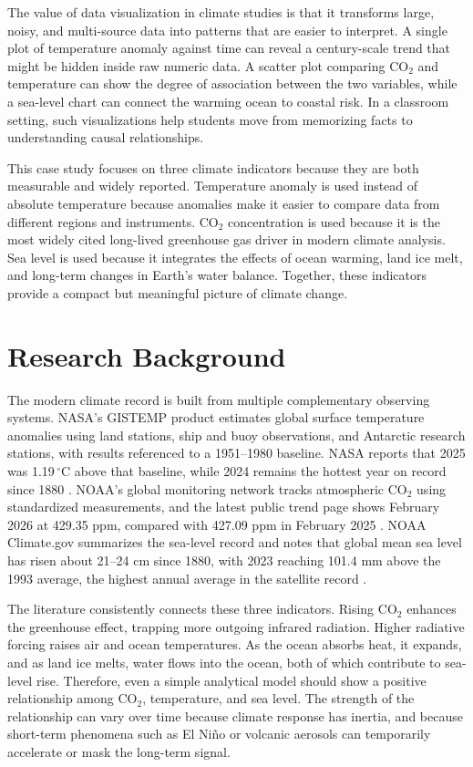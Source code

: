 \documentclass[conference]{IEEEtran}
\begin{document}
The value of data visualization in climate studies is that it transforms large, noisy, and multi-source data into patterns that are easier to interpret. A single plot of temperature anomaly against time can reveal a century-scale trend that might be hidden inside raw numeric data. A scatter plot comparing CO$_2$ and temperature can show the degree of association between the two variables, while a sea-level chart can connect the warming ocean to coastal risk. In a classroom setting, such visualizations help students move from memorizing facts to understanding causal relationships.

This case study focuses on three climate indicators because they are both measurable and widely reported. Temperature anomaly is used instead of absolute temperature because anomalies make it easier to compare data from different regions and instruments. CO$_2$ concentration is used because it is the most widely cited long-lived greenhouse gas driver in modern climate analysis. Sea level is used because it integrates the effects of ocean warming, land ice melt, and long-term changes in Earth’s water balance. Together, these indicators provide a compact but meaningful picture of climate change.

\section{Research Background}
The modern climate record is built from multiple complementary observing systems. NASA’s GISTEMP product estimates global surface temperature anomalies using land stations, ship and buoy observations, and Antarctic research stations, with results referenced to a 1951--1980 baseline. NASA reports that 2025 was 1.19\,$^\circ$C above that baseline, while 2024 remains the hottest year on record since 1880 \cite{nasa_temp,nasa_worldofchange}. NOAA’s global monitoring network tracks atmospheric CO$_2$ using standardized measurements, and the latest public trend page shows February 2026 at 429.35 ppm, compared with 427.09 ppm in February 2025 \cite{noaa_co2}. NOAA Climate.gov summarizes the sea-level record and notes that global mean sea level has risen about 21--24 cm since 1880, with 2023 reaching 101.4 mm above the 1993 average, the highest annual average in the satellite record \cite{noaa_sea,noaa_state2023}.

The literature consistently connects these three indicators. Rising CO$_2$ enhances the greenhouse effect, trapping more outgoing infrared radiation. Higher radiative forcing raises air and ocean temperatures. As the ocean absorbs heat, it expands, and as land ice melts, water flows into the ocean, both of which contribute to sea-level rise. Therefore, even a simple analytical model should show a positive relationship among CO$_2$, temperature, and sea level. The strength of the relationship can vary over time because climate response has inertia, and because short-term phenomena such as El Niño or volcanic aerosols can temporarily accelerate or mask the long-term signal.
\end{document}
